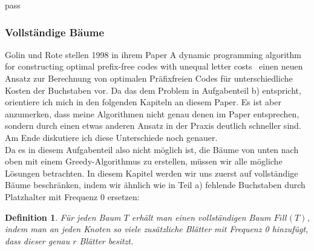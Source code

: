 pass\documentclass[a4paper,10pt,ngerman]{scrartcl}
\newtheorem{definition}[satz]{Definition}
\begin{document}
    \subsubsection{Vollständige Bäume}
    Golin und Rote stellen 1998 in ihrem Paper \glqq A dynamic programming algorithm for constructing optimal prefix-free codes with unequal letter costs\grqq\autocite{golin_dynamic_1998}~ einen neuen Ansatz zur Berechnung von optimalen Präfixfreien Codes für unterschiedliche Kosten der Buchstaben vor.
    Da das dem Problem in Aufgabenteil b) entspricht, orientiere ich mich in den folgenden Kapiteln an diesem Paper.
    Es ist aber anzumerken, dass meine Algorithmen nicht genau denen im Paper entsprechen, sondern durch einen etwas anderen Ansatz in der Praxis deutlich schneller sind.
    Am Ende diskutiere ich diese Unterschiede noch genauer.\\
    Da es in diesem Aufgabenteil also nicht möglich ist, die Bäume von unten nach oben mit einem Greedy-Algorithmus zu erstellen, müssen wir alle mögliche Lösungen betrachten.
    In diesem Kapitel werden wir uns zuerst auf vollständige Bäume beschränken, indem wir ähnlich wie in Teil a) fehlende Buchstaben durch Platzhalter mit Frequenz 0 ersetzen:
    \begin{definition}
        Für jeden Baum $T$ erhält man einen vollständigen Baum $Fill(T)$, indem man an jeden Knoten so viele zusätzliche Blätter mit Frequenz 0 hinzufügt, dass dieser genau $r$ Blätter besitzt.
    \end{definition}
\end{document}
